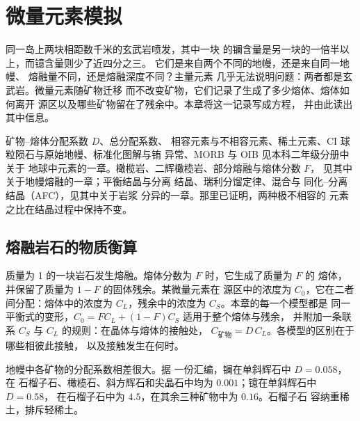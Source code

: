 \chapter{微量元素模拟}\label{ch:b3:trace-element-modelling}

同一岛上两块相距数千米的玄武岩喷发，其中一块
的镧含量是另一块的一倍半以上，而镱含量则少了近四分之三。
它们是来自两个不同的地幔，还是来自同一地幔、
熔融量不同，还是熔融深度不同？主量元素
几乎无法说明问题：两者都是玄武岩。微量元素随矿物迁移
而不改变矿物，它们记录了生成了多少熔体、熔体如何离开
源区以及哪些矿物留在了残余中。本章将这一记录写成方程，
并由此读出其中信息。

\begin{recall}
矿物–熔体分配系数 $D$、总分配系数、
相容元素与不相容元素、稀土元素、CI
球粒陨石与原始地幔、标准化图解与铕
异常、MORB 与 OIB 见本科二年级分册中关于
地球中元素的一章。橄榄岩、二辉橄榄岩、部分熔融与熔体分数 $F$，
见其中关于地幔熔融的一章；平衡结晶与分离
结晶、瑞利分馏定律、混合与
同化–分离结晶（AFC），见其中关于岩浆
分异的一章。那里已证明，两种极不相容的
元素之比在结晶过程中保持不变。
\end{recall}

\section{熔融岩石的物质衡算}\label{sec:b3:trace-element-modelling:balance}

质量为 1 的一块岩石发生熔融。熔体分数为 $F$ 时，它生成了质量为 $F$ 的
熔体，并保留了质量为 $1 - F$ 的固体残余。某微量元素在
源区中的浓度为 $C_0$，它在二者间分配：熔体中的浓度为
$C_L$，残余中的浓度为 $C_S$。本章的每一个模型都是
同一平衡式的变形，$C_0 = FC_L + (1 - F)C_S$ 适用于整个熔体与残余，
并附加一条联系 $C_S$ 与 $C_L$ 的规则：在晶体与熔体的接触处，
$C_{\text{矿物}} = D\,C_L$。各模型的区别在于哪些相彼此接触，
以及接触发生在何时。

地幔中各矿物的分配系数相差很大。据
一份汇编，镧在单斜辉石中 $D = 0.058$，在
石榴子石、橄榄石、斜方辉石和尖晶石中均为 $0.001$；镱在单斜辉石中 $D = 0.58$，
在石榴子石中为 $4.5$，在其余三种矿物中为 $0.16$。石榴子石
容纳重稀土，排斥轻稀土。

